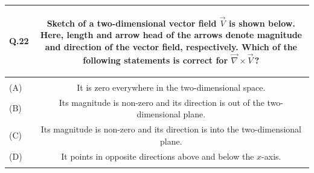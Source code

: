 \documentclass[12pt,a4paper]{article}
\begin{document}
\newpage
\begin{table}[h!]
\begin{tabular}{|L|C|}
\hline
Q.22 &
Sketch of a two-dimensional vector field $\vec{V}$ is shown below. Here, length and
arrow head of the arrows denote magnitude and direction of the vector field,
respectively. Which of the following statements is correct for $\vec{\nabla} \times \vec{V}$\,?

\vspace{0.4cm}

\begin{center}
\end{center}
\\
\hline
 & \\
\hline
(A) & It is zero everywhere in the two-dimensional space. \\
\hline
(B) & Its magnitude is non-zero and its direction is out of the two-dimensional plane. \\
\hline
(C) & Its magnitude is non-zero and its direction is into the two-dimensional plane. \\
\hline
(D) & It points in opposite directions above and below the $x$-axis. \\
\hline
 & \\
\hline
\end{tabular}
\end{table}
\end{document}
